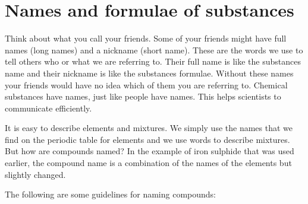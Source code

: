             \section{Names and formulae of substances}
            \nopagebreak
      \label{m38708*eip-379}Think about what you call your friends. Some of your friends might have full names (long names) and a nickname (short name). These are the words we use to tell others who or what we are referring to. Their full name is like the substances name and their nickname is like the substances formulae. Without these names your friends would have no idea which of them you are referring to. Chemical substances have names, just like people have names. This helps scientists to communicate efficiently.     \par \label{m38708*id64028}It is easy to describe elements and mixtures. We simply use the names that we find on the periodic table for elements and we use words to describe mixtures. But how are compounds named? In the example of iron sulphide that was used earlier, the compound name is a combination of the names of the elements but slightly changed. \par 
      \label{m38708*id64033}The following are some guidelines for naming compounds:\par 
